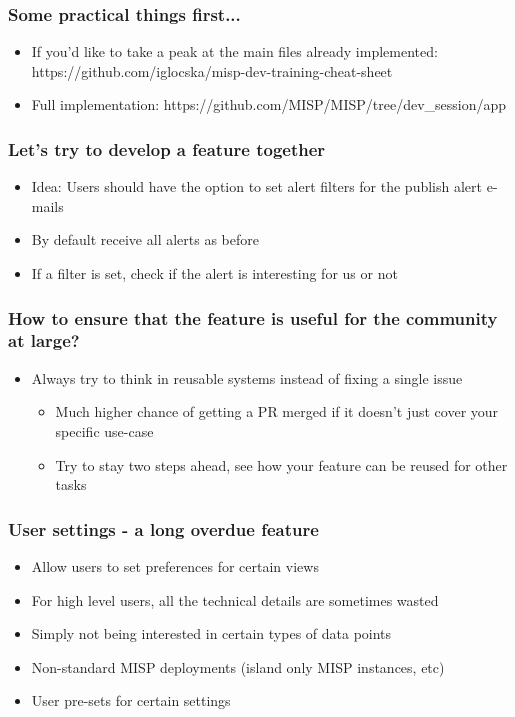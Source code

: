 
\begin{frame}
\titlepage
\end{frame}

\begin{frame}
  \frametitle{Some practical things first...}
  \begin{itemize}
    \item If you'd like to take a peak at the main files already implemented: https://github.com/iglocska/misp-dev-training-cheat-sheet
    \item Full implementation: https://github.com/MISP/MISP/tree/dev\_session/app
  \end{itemize}
\end{frame}

\begin{frame}
  \frametitle{Let's try to develop a feature together}
  \begin{itemize}
    \item Idea: Users should have the option to set alert filters for the publish alert e-mails
    \item By default receive all alerts as before
    \item If a filter is set, check if the alert is interesting for us or not
  \end{itemize}
\end{frame}

\begin{frame}
  \frametitle{How to ensure that the feature is useful for the community at large?}
  \begin{itemize}
    \item Always try to think in reusable systems instead of fixing a single issue
    \begin{itemize}
      \item Much higher chance of getting a PR merged if it doesn't just cover your specific use-case
      \item Try to stay two steps ahead, see how your feature can be reused for other tasks
    \end{itemize}
  \end{itemize}
\end{frame}

\begin{frame}
  \frametitle{User settings - a long overdue feature}
  \begin{itemize}
    \item Allow users to set preferences for certain views
    \item For high level users, all the technical details are sometimes wasted
    \item Simply not being interested in certain types of data points
    \item Non-standard MISP deployments (island only MISP instances, etc)
    \item User pre-sets for certain settings  
  \end{itemize}
\end{frame}

